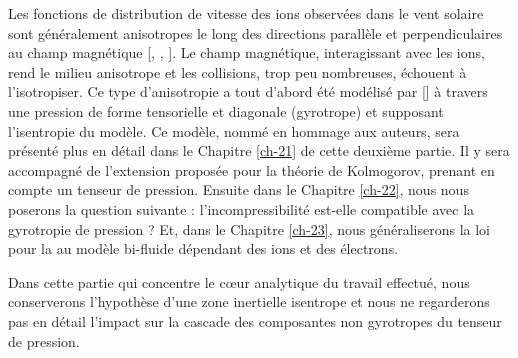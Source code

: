 Les fonctions de distribution de vitesse des ions observées dans le vent solaire sont généralement anisotropes le long des directions parallèle et perpendiculaires au champ magnétique [\cite{marsch_pronounced_1981}, \cite{matteini_evolution_2007}, \cite{bale_magnetic_2009}]. Le champ magnétique, interagissant avec les ions, rend le milieu anisotrope et les collisions, trop peu nombreuses, échouent à l'isotropiser. Ce type d'anisotropie a tout d'abord été modélisé par [\cite{chew_boltzmann_1956}] à travers une pression de forme tensorielle et diagonale (gyrotrope) et supposant l'isentropie du modèle. Ce modèle, nommé  en hommage aux auteurs, sera présenté plus en détail dans le Chapitre \ref{ch-21} de cette deuxième partie. Il y sera accompagné de l'extension proposée pour la théorie de Kolmogorov, prenant en compte un tenseur de pression. Ensuite dans le Chapitre \ref{ch-22}, nous nous poserons la question suivante : l'incompressibilité est-elle compatible avec la gyrotropie de pression ? Et, dans le Chapitre \ref{ch-23}, nous 
généraliserons la loi pour la  au modèle bi-fluide dépendant des ions et des électrons.

Dans cette partie qui concentre le cœur analytique du travail effectué, nous conserverons l'hypothèse d'une zone inertielle isentrope et nous ne regarderons pas en détail l'impact sur la cascade des composantes non gyrotropes du tenseur de pression.
